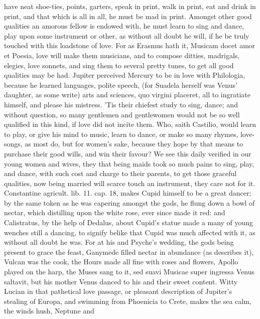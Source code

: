 have neat shoe-ties, points, garters, speak in print, walk in print,
eat and drink in print, and that which is all in all, he must be mad in
print.
Amongst other good qualities an amorous fellow is endowed with, he must
learn to sing and dance, play upon some instrument or other, as without
all doubt he will, if he be truly touched with this loadstone of love.
For as Erasmus hath it, Musicam docet amor et Poesia, love will
make them musicians, and to compose ditties, madrigals, elegies, love
sonnets, and sing them to several pretty tunes, to get all good
qualities may be had. Jupiter perceived Mercury to be in love
with Philologia, because he learned languages, polite speech, (for
Suadela herself was Venus' daughter, as some write) arts and sciences,
quo virgini placeret, all to ingratiate himself, and please his
mistress. 'Tis their chiefest study to sing, dance; and without
question, so many gentlemen and gentlewomen would not be so well
qualified in this kind, if love did not incite them. Who, saith
Castilio, would learn to play, or give his mind to music, learn to
dance, or make so many rhymes, love-songs, as most do, but for women's
sake, because they hope by that means to purchase their good wills, and
win their favour? We see this daily verified in our young women and
wives, they that being maids took so much pains to sing, play, and
dance, with such cost and charge to their parents, to get those
graceful qualities, now being married will scarce touch an instrument,
they care not for it. Constantine agricult. lib. 11. cap. 18, makes
Cupid himself to be a great dancer; by the same token as he was
capering amongst the gods, he flung down a bowl of nectar, which
distilling upon the white rose, ever since made it red: and
Calistratus, by the help of Dedalus, about Cupid's statue made a
many of young wenches still a dancing, to signify belike that Cupid was
much affected with it, as without all doubt he was. For at his and
Psyche's wedding, the gods being present to grace the feast, Ganymede
filled nectar in abundance (as \Apuleius describes it), Vulcan was
the cook, the Hours made all fine with roses and flowers, Apollo played
on the harp, the Muses sang to it, sed suavi Musicae super ingressa
Venus saltavit, but his mother Venus danced to his and their sweet
content. Witty Lucian in that pathetical love passage, or
pleasant description of Jupiter's stealing of Europa, and swimming from
Phoenicia to Crete, makes the sea calm, the winds hush, Neptune and
